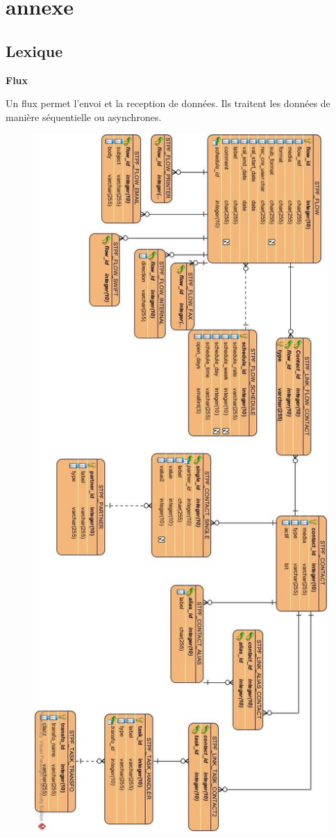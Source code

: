 \chapter{annexe}

\section{Lexique}

\textbf{Flux}
\begin{flushleft}
Un flux permet l'envoi et la reception de données. Ils traitent les données de manière séquentielle ou asynchrones.

\end{flushleft}

\begin{figure} %
\centering
\includegraphics[scale=0.6]{Images/FlowDetailsExistant.jpg}

\end{figure}
